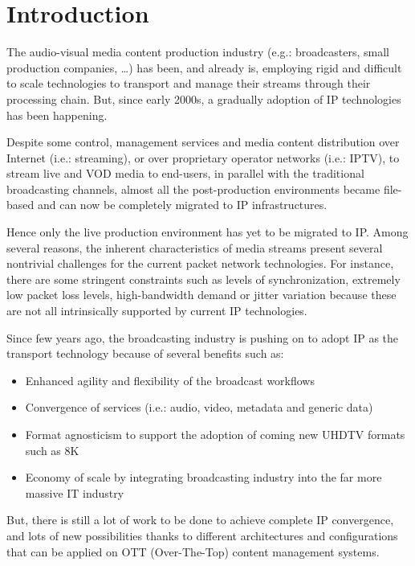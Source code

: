 \cleardoublepage
{}
\chapter*{Introduction}

The audio-visual media content production industry (e.g.: broadcasters, small production companies, \ldots) has been, and already is, employing rigid and difficult to scale technologies to transport and manage their streams through their processing chain. But, since early 2000s, a gradually adoption of IP technologies has been happening.

Despite some control, management services and media content distribution over Internet (i.e.: streaming), or over proprietary operator networks (i.e.: IPTV), to stream live and VOD media to end-users, in parallel with the traditional broadcasting channels, almost all the post-production environments became file-based and can now be completely migrated to IP infrastructures. 

Hence only the live production environment has yet to be migrated to IP. Among several reasons, the inherent characteristics of media streams present several nontrivial challenges for the current packet network technologies. For instance, there are some stringent constraints such as levels of synchronization, extremely low packet loss levels, high-bandwidth demand or jitter variation because these are not all intrinsically supported by current IP technologies.

Since few years ago, the broadcasting industry is pushing on to adopt IP as the transport technology because of several benefits such as:

\begin{itemize}
  \item Enhanced agility and flexibility of the broadcast workflows
  \item Convergence of services (i.e.: audio, video, metadata and generic data)
  \item Format agnosticism to support the adoption of coming new UHDTV formats such as 8K 
  \item Economy of scale by integrating broadcasting industry into the far more massive IT industry
\end{itemize}

But, there is still a lot of work to be done to achieve complete IP convergence, and lots of new possibilities thanks to different architectures and configurations that can be applied on OTT (Over-The-Top) content management systems. 


